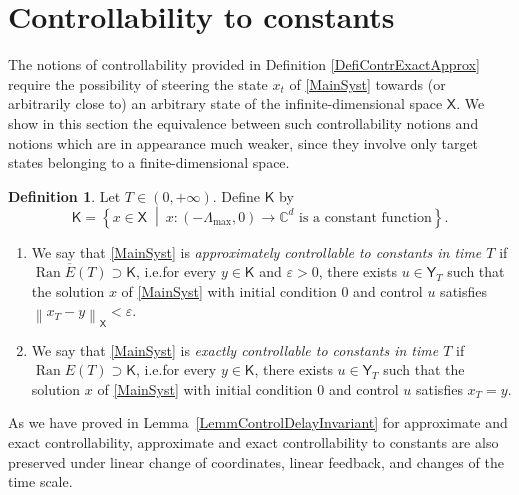 \documentclass[10pt]{amsart}
\theoremstyle{plain}
\theoremstyle{definition}
\newtheorem{defi}[theo]{Definition}
\DeclareMathOperator{\range}{Ran}
\newcommand{\midsuchthat}{\;\middle|\:}
\newcommand{\norm}[1]{\left\lVert #1\right\lVert}
\providecommand{\ie}{i.e.}\providecommand{\etc}{etc.}\providecommand{\resp}{resp.}\providecommand{\cf}{cf.}
\begin{document}
\section{Controllability to constants}
\label{SecContrConst}

The notions of controllability provided in Definition \ref{DefiContrExactApprox} require the possibility of steering the state $x_t$ of \eqref{MainSyst} towards (or arbitrarily close to) an arbitrary state of the infinite-dimensional space $\mathsf X$. We show in this section the equivalence between such controllability notions and notions which are in appearance much weaker, since they involve only target states belonging to a finite-dimensional space.

\begin{defi}
\label{DefiControlToCst}
Let $T \in (0, +\infty)$.
Define $\mathsf K$ by
\begin{equation}
\label{DefMathsfK}
\mathsf K = \left\{x \in \mathsf X \midsuchthat x: (-\Lambda_{\max}, 0) \rightarrow \mathbb C^d \text{ is a constant function}\right\}.
\end{equation}

\begin{enumerate}
\item We say that \eqref{MainSyst} is \emph{approximately controllable to constants in time $T$} if $\overline{\range E(T)} \supset \mathsf K$, \ie for every $y \in \mathsf K$ and $\varepsilon > 0$, there exists $u \in \mathsf Y_T$ such that the solution $x$ of \eqref{MainSyst} with initial condition $0$ and control $u$ satisfies $\norm{x_T - y}_{\mathsf X} < \varepsilon$.

\item We say that \eqref{MainSyst} is \emph{exactly controllable to constants in time $T$} if $\range E(T) \supset \mathsf K$, \ie for every $y \in \mathsf K$, there exists $u \in \mathsf Y_T$ such that the solution $x$ of \eqref{MainSyst} with initial condition $0$ and control $u$ satisfies $x_T = y$.
\end{enumerate}
\end{defi}

As we have proved in Lemma~\ref{LemmControlDelayInvariant} for approximate and exact controllability, approx\-imate and exact controllability to constants are also preserved under linear change of coordinates, linear feedback, and changes of the time scale.
\end{document}

